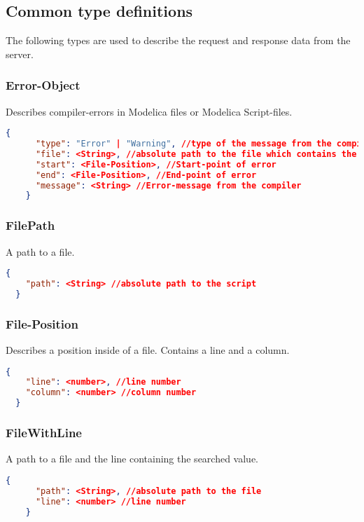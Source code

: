 \subsection{Common type definitions}
The following types are used to describe the request and response data
from the server.

\subsubsection{Error-Object}
Describes compiler-errors in Modelica files or Modelica Script-files.
\newline{}
  \begin{lstlisting}[basicstyle=\small,language=json]
    {
      "type": "Error" | "Warning", //type of the message from the compiler
      "file": <String>, //absolute path to the file which contains the error
      "start": <File-Position>, //Start-point of error
      "end": <File-Position>, //End-point of error
      "message": <String> //Error-message from the compiler
    }
  \end{lstlisting}

\subsubsection{FilePath}
A path to a file.
\newline{}
\begin{lstlisting}[basicstyle=\small,language=json]
  {
    "path": <String> //absolute path to the script
  }
\end{lstlisting}

\subsubsection{File-Position}
Describes a position inside of a file. Contains a
line and a column.
\newline{}
  \begin{lstlisting}[basicstyle=\small,language=json]
  {
    "line": <number>, //line number
    "column": <number> //column number
  }
  \end{lstlisting}

  \subsubsection{FileWithLine}
  A path to a file and the line containing the searched value.
  \newline{}
  \begin{lstlisting}[basicstyle=\small,language=json]
    {
      "path": <String>, //absolute path to the file
      "line": <number> //line number
    }
  \end{lstlisting}


